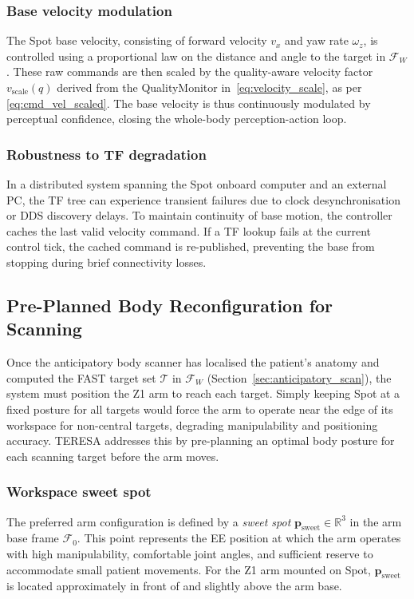 \subsubsection{Base velocity modulation}
The Spot base velocity, consisting of forward velocity $v_x$ and yaw rate
$\omega_z$, is controlled using a proportional law on the distance and
angle to the target in $\mathcal{F}_W$. These raw commands are then scaled
by the quality-aware velocity factor $v_{\mathrm{scale}}(q)$ derived from
the QualityMonitor in~\eqref{eq:velocity_scale}, as per
\eqref{eq:cmd_vel_scaled}. The base velocity is thus continuously modulated
by perceptual confidence, closing the whole-body perception-action loop.

\subsubsection{Robustness to TF degradation}
In a distributed system spanning the Spot onboard computer and an external
PC, the \ac{TF} tree can experience transient failures due to clock
desynchronisation or \ac{DDS} discovery delays. To maintain continuity of
base motion, the controller caches the last valid velocity command. If a
\ac{TF} lookup fails at the current control tick, the cached command is
re-published, preventing the base from stopping during brief connectivity
losses.

\subsection{Pre-Planned Body Reconfiguration for Scanning}

Once the anticipatory body scanner has localised the patient's anatomy and
computed the FAST target set $\mathcal{T}$ in $\mathcal{F}_W$
(Section~\ref{sec:anticipatory_scan}), the system must position the Z1 arm
to reach each target. Simply keeping Spot at a fixed posture for all
targets would force the arm to operate near the edge of its workspace for
non-central targets, degrading manipulability and positioning accuracy.
\ac{TERESA} addresses this by pre-planning an optimal body posture for
each scanning target before the arm moves.

\subsubsection{Workspace sweet spot}
The preferred arm configuration is defined by a \textit{sweet spot}
$\mathbf{p}_{\mathrm{sweet}} \in \mathbb{R}^3$ in the arm base frame
$\mathcal{F}_0$. This point represents the \ac{EE} position at which the
arm operates with high manipulability, comfortable joint angles, and
sufficient reserve to accommodate small patient movements. For the Z1 arm
mounted on Spot, $\mathbf{p}_{\mathrm{sweet}}$ is located approximately
in front of and slightly above the arm base.

